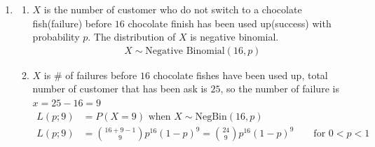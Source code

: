 \documentclass[12pt, oneside, a4paper]{article}
\begin{document}
\begin{enumerate}
\begin{enumerate}[label = (\alph*)]
		\end{enumerate}
		\item \begin{enumerate}[label = (\alph*)]
			\item $X$ is the number of customer who do not switch to a chocolate fish(failure) before $16$ chocolate finish has been used up(success) with probability $p$. The distribution of $X$ is negative binomial. \begin{align*}
				X \sim \text{Negative Binomial}(16, p)
			\end{align*}
			\item $X$ is \# of failures before $16$ chocolate fishes have been used up, total number of customer that has been ask is $25$, so the number of failure is $x = 25-16 = 9$\\
			 \begin{align*}
			 L(p;9) & = P(X = 9) \text{ when } X \sim \text{NegBin}(16,p)\\
				L(p;9) & = \binom{16+9-1}{9}p^{16}(1-p)^9 = \binom{24}{9} p^{16}(1-p)^9 \qquad \text{for } 0 < p < 1
			\end{align*} 
			

\end{enumerate}
\end{enumerate}
\end{document}
